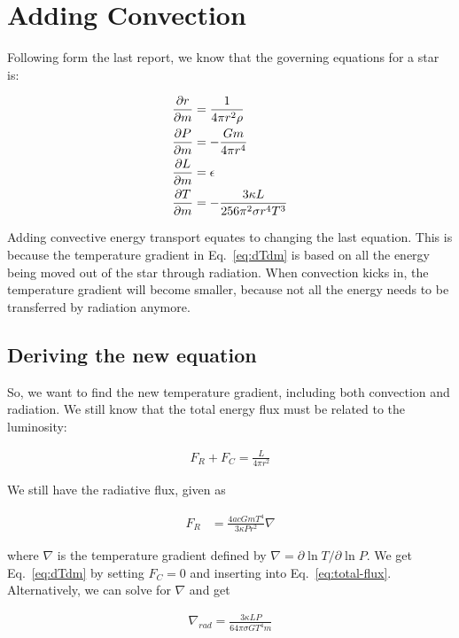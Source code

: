\documentclass[11pt]{article}
\begin{document}
\section{Adding Convection}

Following form the last report, we know that the governing equations for a star is:

\begin{align}
  \frac{\partial r}{\partial m} &= \frac{ 1 }{ 4\pi r^2\rho }\label{eq:drdm}\\
  \frac{\partial P}{\partial m} &= - \frac{ Gm }{ 4\pi r^4 }\label{eq:dPdm}\\
  \frac{\partial L}{\partial m} &= \epsilon\label{eq:dLdm}\\
  \frac{\partial T}{\partial m} &= - \frac{ 3\kappa L }{ 256 \pi^2 \sigma r^4T^3 }\label{eq:dTdm}
\end{align}

Adding convective energy transport equates to changing the last equation. This is because the temperature gradient in Eq.~\eqref{eq:dTdm} is based on all the energy being moved out of the star through radiation. When convection kicks in, the temperature gradient will become smaller, because not all the energy needs to be transferred by radiation anymore.


\subsection{Deriving the new equation}

So, we want to find the new temperature gradient, including both convection and radiation. We still know that the total energy flux must be related to the luminosity:

\begin{align}
    F_R + F_C = \frac{L}{4\pi r^2}\label{eq:total-flux}
\end{align}

We still have the radiative flux, given as

\begin{align}
    F_R &= \frac{4acGmT^4}{3\kappa P r^2}\nabla \label{eq:radiative-flux}
\end{align}

where $\nabla$ is the temperature gradient defined by $\nabla = \partial\ln T/\partial\ln P$.
We get Eq.~\eqref{eq:dTdm} by setting $F_C = 0$ and inserting into Eq.~\eqref{eq:total-flux}. Alternatively, we can solve for $\nabla$ and get

\begin{align}
    \nabla_{rad} = \frac{3\kappa L P} {64\pi\sigma G T^4 m}\label{eq:nabla-rad}
\end{align}
\end{document}
